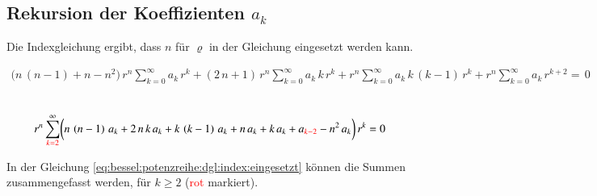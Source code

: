 \subsection{Rekursion der Koeffizienten $a_k$}
\begin{normalsize}
	Die Indexgleichung ergibt, dass $n$ f\"ur $\varrho$ in der Gleichung  eingesetzt werden kann.
\end{normalsize}
\begin{align}
	\biggl(
	n \, \left( n - 1 \right)
	+
	n
	-
	n^2
	\biggr)
	\, r^{n}
	\sum_{k=0}^{\infty} a_k \, r^k
	+
	\left(	
	2 \, n
	+
	1
	\right)
	\, r^{n}
	\sum_{k=0}^{\infty} a_k \, k \, r^k
	+
	r^{n}
	\sum_{k=0}^{\infty} a_k \, k \, \left( k - 1 \right) \, r^k
	+
	r^{n}
	\sum_{k=0}^{\infty} a_k \, r^{k + 2}
	= \, 0
	\label{eq:bessel:potenzreihe:dgl:index:eingesetzt}
\end{align}
\\
\begin{normalsize}

\end{normalsize}
\begin{align}
	r^n
	\sum_{\textcolor{red}{k=2}}^{\infty}
	\biggl(
	n \, \left( n - 1 \right) \, a_k 
	+
	2 \, n \, k \, a_k
	+
	k \, \left( k - 1 \right) \, a_k
	+
	n \, a_k
	+
	k \, a_k
	+
	a_{\textcolor{red}{k - 2}}
	-
	n^2 \, a_k
	\biggr)
	\, r^k
	= 0 
	\label{eq:bessel:summe:zusammengefasst}
\end{align}
\begin{normalsize}
	In der Gleichung \ref{eq:bessel:potenzreihe:dgl:index:eingesetzt} k\"onnen die Summen zusammengefasst werden,
	f\"ur $k \geq 2$ (\textcolor{red}{rot} markiert).
\end{normalsize}
